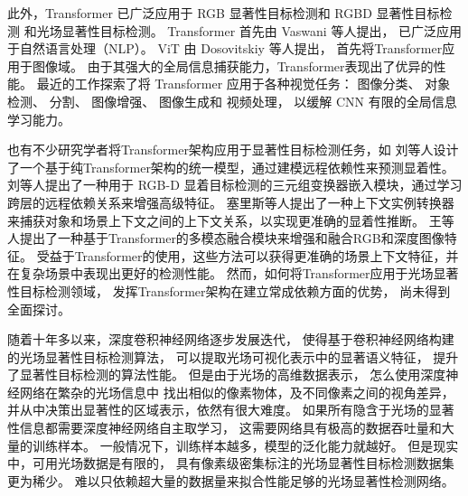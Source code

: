 

此外，Transformer 已广泛应用于 
RGB 显著性目标检测和 
RGBD 显著性目标检测
和光场显著性目标检测。
Transformer 首先由 Vaswani 等人提出，
已广泛应用于自然语言处理（NLP）。
ViT 由 Dosovitskiy 等人提出，
首先将Transformer应用于图像域。
由于其强大的全局信息捕获能力，Transformer表现出了优异的性能。
最近的工作探索了将 Transformer 应用于各种视觉任务：
图像分类、
对象检测、
分割、
图像增强、
图像生成和 
视频处理，
以缓解 CNN 有限的全局信息学习能力。



也有不少研究学者将Transformer架构应用于显著性目标检测任务，如
刘等人设计了一个基于纯Transformer架构的统一模型，通过建模远程依赖性来预测显着性。
刘等人提出了一种用于 RGB-D 显着目标检测的三元组变换器嵌入模块，通过学习跨层的远程依赖关系来增强高级特征。 
塞里斯等人提出了一种上下文实例转换器来捕获对象和场景上下文之间的上下文关系，以实现更准确的显着性推断。 
王等人提出了一种基于Transformer的多模态融合模块来增强和融合RGB和深度图像特征。
受益于Transformer的使用，这些方法可以获得更准确的场景上下文特征，并在复杂场景中表现出更好的检测性能。 然而，如何将Transformer应用于光场显著性目标检测领域，
发挥Transformer架构在建立常成依赖方面的优势，
尚未得到全面探讨。 











随着十年多以来，深度卷积神经网络逐步发展迭代，
使得基于卷积神经网络构建的光场显著性目标检测算法，
可以提取光场可视化表示中的显著语义特征，
提升了显著性目标检测的算法性能。
但是由于光场的高维数据表示，
怎么使用深度神经网络在繁杂的光场信息中
找出相似的像素物体，及不同像素之间的视角差异，
并从中决策出显著性的区域表示，依然有很大难度。
如果所有隐含于光场的显著性信息都需要深度神经网络自主取学习，
这需要网络具有极高的数据吞吐量和大量的训练样本。
一般情况下，训练样本越多，模型的泛化能力就越好。
但是现实中，可用光场数据是有限的，
具有像素级密集标注的光场显著性目标检测数据集更为稀少。
难以只依赖超大量的数据量来拟合性能足够的光场显著性检测网络。



